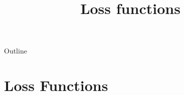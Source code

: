 %

\title[Loss functions]{Loss functions}
%
%

\begin{frame}
  \maketitle
\end{frame}

\begin{frame}{Outline}
  \tableofcontents
\end{frame}

\section{Loss Functions}


